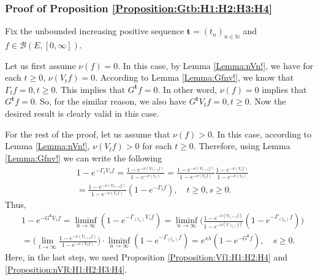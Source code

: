 \documentclass[12pt,a4paper]{amsart}
\numberwithin{equation}{section}
\theoremstyle{plain}
\theoremstyle{definition}
\theoremstyle{remark}
\begin{document}
\subsubsection{Proof of Proposition \ref{Proposition:Gtb:H1:H2:H3:H4}}
Fix the unbounded increasing positive sequence $\mathbf t = (t_n)_{n\in \mathbb N}$ and $f\in \mathcal B(E,[0,\infty])$. 

Let us first assume $\nu(f)=0$. 
In this case, by Lemma \ref{Lemma:nVn!}, we have for each $t\geq 0$, $\nu(V_tf) = 0$. 
According to Lemma \ref{Lemma:Gfnv!}, we know that $\Gamma_t f=0,t\geq 0$. 
This implies that $G^{\mathbf t}f = 0$. 
In other word, $\nu(f) = 0$ implies that $G^\mathbf tf = 0$.
So, for the similar reason, we also have $G^{\mathbf t}V_t f = 0, t\geq 0$. 
Now the desired result is clearly valid in this case.

For the rest of the proof, let us assume that $\nu(f) > 0$. 
In this case, according to Lemma \ref{Lemma:nVn!}, $\nu(V_tf)>0$ for each $t\geq 0$. 
Therefore, using Lemma \ref{Lemma:Gfnv!} we can write the following
\begin{align}
 & 1 - e^{- \Gamma_t V_s f}
 = \frac{ 1 - e^{- \nu(V_{t+s} f)} }{ 1 - e^{- \nu(v_t)}}
 = \frac{ 1 - e^{- \nu(V_{t+s} f)} }{ 1 - e^{- \nu(V_tf)}} \frac{ 1 - e^{ - \nu(V_tf)}}{ 1 - e^{- \nu(v_t)}} 
 \\ & = \frac{ 1 - e^{- \nu(V_{t+s} f)} }{ 1 - e^{- \nu(V_tf)}} ( 1 - e^{- \Gamma_t f}), 
 \quad t\geq 0, s \geq 0.
 \end{align}
Thus,
\begin{align}
 & 1 - e^{- G^{\mathbf t} V_s f}
 = \liminf_{n\to \infty} ( 1 - e^{- \Gamma_{(t_n)} V_s f})
 = \liminf_{n\to \infty} \Big( \frac{ 1 - e^{- \nu(V_{t_n+s}f)}}{ 1 - e^{- \nu(V_{(t_n)}f)}} (1 - e^{- \Gamma_{(t_n)} f}) \Big) 
 \\& = \Big( \lim_{t \to \infty} \frac{ 1 - e^{- \nu(V_{t+s}f)}}{ 1 - e^{- \nu(V_{t}f)}} \Big) \cdot \liminf_{n\to \infty} (1 - e^{- \Gamma_{(t_n)} f} )
 = e^{s\lambda} (1 - e^{- G^{\mathbf t}f}), \quad s\geq 0.
 \end{align}
Here, in the last step, we used Proposition \ref{Proposition:Vf1:H1:H2:H4} and \ref{Proposition:nVR:H1:H2:H3:H4}.
\end{document}
